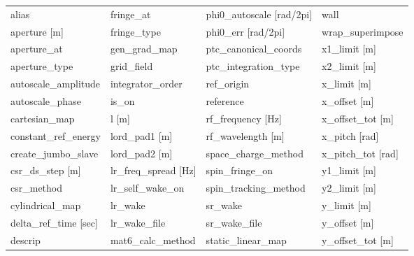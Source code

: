  \begin{tabular}{llll} \toprule
alias                            & fringe_at                        & phi0_autoscale [rad/2pi]         & wall                             \\
aperture [m]                     & fringe_type                      & phi0_err [rad/2pi]               & wrap_superimpose                 \\
aperture_at                      & gen_grad_map                     & ptc_canonical_coords             & x1_limit [m]                     \\
aperture_type                    & grid_field                       & ptc_integration_type             & x2_limit [m]                     \\
autoscale_amplitude              & integrator_order                 & ref_origin                       & x_limit [m]                      \\
autoscale_phase                  & is_on                            & reference                        & x_offset [m]                     \\
cartesian_map                    & l [m]                            & rf_frequency [Hz]                & x_offset_tot [m]                 \\
constant_ref_energy              & lord_pad1 [m]                    & rf_wavelength [m]                & x_pitch [rad]                    \\
create_jumbo_slave               & lord_pad2 [m]                    & space_charge_method              & x_pitch_tot [rad]                \\
csr_ds_step [m]                  & lr_freq_spread [Hz]              & spin_fringe_on                   & y1_limit [m]                     \\
csr_method                       & lr_self_wake_on                  & spin_tracking_method             & y2_limit [m]                     \\
cylindrical_map                  & lr_wake                          & sr_wake                          & y_limit [m]                      \\
delta_ref_time [sec]             & lr_wake_file                     & sr_wake_file                     & y_offset [m]                     \\
descrip                          & mat6_calc_method                 & static_linear_map                & y_offset_tot [m]                 \\

\end{tabular}
